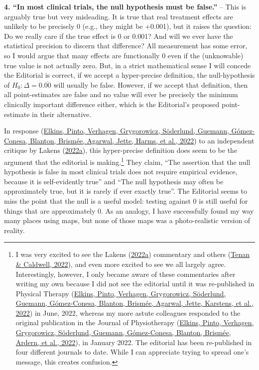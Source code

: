 \documentclass[]{cik}%
\begin{document}
\textbf{4. ``In most clinical trials, the null hypothesis must be
false.''} -- This is arguably true but very misleading. It is true that
real treatment effects are unlikely to be precisely 0 (e.g., they might
be +0.001), but it raises the question: Do we really care if the true
effect is 0 or 0.001? And will we ever have the statistical precision to
discern that difference? All measurement has some error, so I would
argue that many effects are functionally 0 even if the (unknowable) true
value is not actually zero. But, in a strict mathematical sense I will
concede the Editorial is correct, if we accept a hyper-precise
definition, the null-hypothesis of \(H_{0}: \Delta = 0.\overline{00}\)
will usually be false. However, if we accept that definition, then all
point-estimates are false and no value will ever be precisely the
minimum clinically important difference either, which is the Editorial's
proposed point-estimate in their alternative.

In response (\protect\hyperlink{ref-17}{Elkins, Pinto, Verhagen,
Grygorowicz, Söderlund, Guemann, Gómez-Conesa, Blanton, Brismée,
Agarwal, Jette, Harms, et al., 2022}) to an independent critique by
Lakens (\protect\hyperlink{ref-18}{2022a}), this hyper-precise
definition does seem to be the argument that the editorial is
making.\footnote{I was very excited to see the Lakens
  (\protect\hyperlink{ref-18}{2022a}) commentary and others
  (\protect\hyperlink{ref-19}{Tenan \& Caldwell, 2022}), and even more
  excited to see we all largely agree. Interestingly, however, I only
  became aware of these commentaries after writing my own because I did
  not see the editorial until it was re-published in Physical Therapy
  (\protect\hyperlink{ref-1}{Elkins, Pinto, Verhagen, Grygorowicz,
  Söderlund, Guemann, Gómez-Conesa, Blanton, Brismée, Agarwal, Jette,
  Karstens, et al., 2022}) in June, 2022, whereas my more astute
  colleagues responded to the original publication in the Journal of
  Physiotherapy (\protect\hyperlink{ref-20}{Elkins, Pinto, Verhagen,
  Grygorowicz, Söderlund, Guemann, Gómez-Conesa, Blanton, Brismée,
  Ardern, et al., 2022}), in January 2022. The editorial has been
  re-published in four different journals to date. While I can
  appreciate trying to spread one's message, this creates confusion.}
They claim, ``The assertion that the null hypothesis is false in most
clinical trials does not require empirical evidence, because it is
self-evidently true'' and ``The null hypothesis may often be
approximately true, but it is rarely if ever exactly true''. The
Editorial seems to miss the point that the null is a useful model:
testing against 0 is still useful for things that are approximately 0.
As an analogy, I have successfully found my way many places using maps,
but none of those maps was a photo-realistic version of reality.
\end{document}
